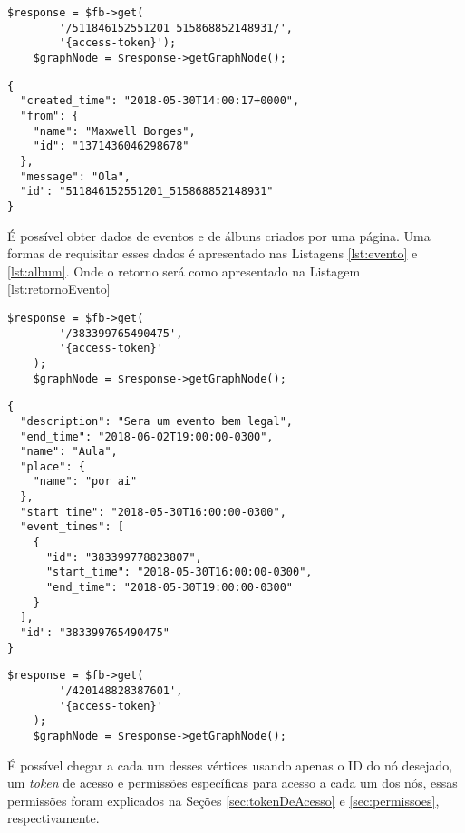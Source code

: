 \begin{lstlisting}[caption={Requisitar informações de um comentário específico},label={lst:comentario}]
    $response = $fb->get(
        '/511846152551201_515868852148931/',
        '{access-token}');
    $graphNode = $response->getGraphNode();
\end{lstlisting}

\begin{lstlisting}[caption={Resposta do servidor a uma requisição \ref{lst:comentario} (Comentário)},label={lst:retornoComentario}]
{
  "created_time": "2018-05-30T14:00:17+0000",
  "from": {
    "name": "Maxwell Borges",
    "id": "1371436046298678"
  },
  "message": "Ola",
  "id": "511846152551201_515868852148931"
}
\end{lstlisting}

É possível obter dados de eventos e de álbuns criados por uma página. Uma formas de requisitar esses dados é apresentado nas Listagens \ref{lst:evento} e \ref{lst:album}. Onde o retorno será como apresentado na Listagem \ref{lst:retornoEvento}

\begin{lstlisting}[caption={Requisitar uma evento específico},label={lst:evento}]
	$response = $fb->get(
    	'/383399765490475',
    	'{access-token}'
	);
	$graphNode = $response->getGraphNode();
\end{lstlisting}

\begin{lstlisting}[caption={Resposta do servidor a requisição \ref{lst:evento} (Evento)},label={lst:retornoEvento}]
{
  "description": "Sera um evento bem legal",
  "end_time": "2018-06-02T19:00:00-0300",
  "name": "Aula",
  "place": {
    "name": "por ai"
  },
  "start_time": "2018-05-30T16:00:00-0300",
  "event_times": [
    {
      "id": "383399778823807",
      "start_time": "2018-05-30T16:00:00-0300",
      "end_time": "2018-05-30T19:00:00-0300"
    }
  ],
  "id": "383399765490475"
}
\end{lstlisting}

\begin{lstlisting}[caption={Requisitar uma álbum específico},label={lst:album}]
	$response = $fb->get(
		'/420148828387601',
		'{access-token}'
	);
	$graphNode = $response->getGraphNode();
\end{lstlisting}

É possível chegar a cada um desses vértices usando apenas o ID do nó desejado, um \textit{token} de acesso e permissões específicas para acesso a cada um dos nós, essas permissões foram explicados na Seções \ref{sec:tokenDeAcesso} e \ref{sec:permissoes}, respectivamente.

